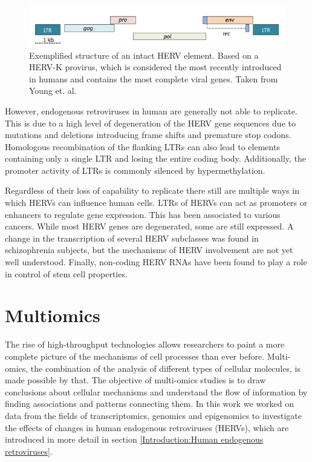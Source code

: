 \documentclass[a4paper,12pt,twoside,openright]{report}
\begin{document}
\begin{figure}[tb]
	\includegraphics[scale = 0.92, keepaspectratio = true]{../figures/herv_structure_example}  
	\caption{Exemplified structure of an intact HERV element. Based on a HERV-K provirus, which is considered the most recently introduced in humans and contains the most complete viral genes. Taken from Young et. al. \cite{BIES:BIES201300049}}
    \label{fig:herv.structure.example}
\end{figure}

However, endogenous retroviruses in human are generally not able to replicate. This is due to a high level of degeneration of the HERV gene sequences due to mutations and deletions introducing frame shifts and premature stop codons. Homologous recombination of the flanking LTRs can also lead to elements containing only a single LTR and losing the entire coding body\cite{10.1146/annurev.genom.7.080505.115700}. Additionally, the promoter activity of LTRs is commonly silenced by hypermethylation\cite{Smith2013}.

Regardless of their loss of capability to replicate there still are multiple ways in which HERVs can influence human cells. LTRs of HERVs can act as promoters or enhancers to regulate gene expression. This has been associated to various cancers\cite{10.3892/ijmm.2013.1460}. While most HERV genes are degenerated, some are still expressed. A change in the transcription of several HERV subclasses was found in schizophrenia subjects, but the mechanisms of HERV involvement are not yet well understood\cite{10.3389/fpsyt.2015.00183}. Finally, non-coding HERV RNAs have been found to play a role in control of stem cell properties\cite{APM:APM12476}. 

\section{Multiomics}
\label{Introduction:Multiomics}
The rise of high-throughput technologies allows researchers to paint a more complete picture of the mechanisms of cell processes than ever before. Multi-omics, the combination of the analysis of different types of cellular molecules, is made possible by that. The objective of multi-omics studies is to draw conclusions about cellular mechanisms and understand the flow of information by finding associations and patterns connecting them\cite{Hasin2017}. In this work we worked on data from the fields of transcriptomics, genomics and epigenomics to investigate the effects of changes in human endogenous retroviruses (HERVs), which are introduced in more detail in section \ref{Introduction:Human endogenous retroviruses}.
\end{document}
